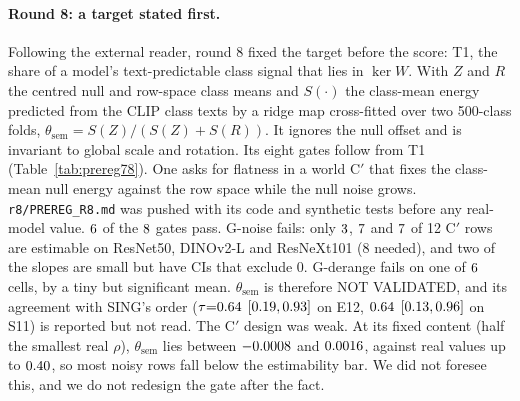 \documentclass[10pt]{article}
\begin{document}
\paragraph{Round 8: a target stated first.}
Following the external reader, round 8 fixed the target before the score: T1, the share of a model's text-predictable class signal that lies in $\ker W$. With $Z$ and $R$ the centred null and row-space class means and $S(\cdot)$ the class-mean energy predicted from the CLIP class texts by a ridge map cross-fitted over two 500-class folds, $\theta_{\mathrm{sem}}=S(Z)/(S(Z)+S(R))$. It ignores the null offset and is invariant to global scale and rotation. Its eight gates follow from T1 (Table~\ref{tab:prereg78}). One asks for flatness in a world C$'$ that fixes the class-mean null energy against the row space while the null noise grows. \texttt{r8/PREREG\_R8.md} was pushed with its code and synthetic tests before any real-model value.
$6$ of the $8$ gates pass. G-noise fails: only $3$, $7$ and $7$ of 12 C$'$ rows are estimable on ResNet50, DINOv2-L and ResNeXt101 (8 needed), and two of the slopes are small but have CIs that exclude 0. G-derange fails on one of $6$ cells, by a tiny but significant mean. $\theta_{\mathrm{sem}}$ is therefore NOT VALIDATED, and its agreement with SING's order ($\tau{=}0.64$ $[0.19,0.93]$ on E12, $0.64$ $[0.13,0.96]$ on S11) is reported but not read.
The C$'$ design was weak. At its fixed content (half the smallest real $\rho$), $\theta_{\mathrm{sem}}$ lies between $-0.0008$ and $0.0016$, against real values up to $0.40$, so most noisy rows fall below the estimability bar. We did not foresee this, and we do not redesign the gate after the fact.
\end{document}
